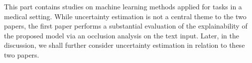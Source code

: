 


 
This part contains studies on machine learning methods applied for tasks in a medical setting. While uncertainty estimation is not a central theme to the two papers, the first paper performs a substantial evaluation of the explainability of the proposed model via an occlusion analysis on the text input. Later, in the discussion, we shall further consider uncertainty estimation in relation to these two papers.

